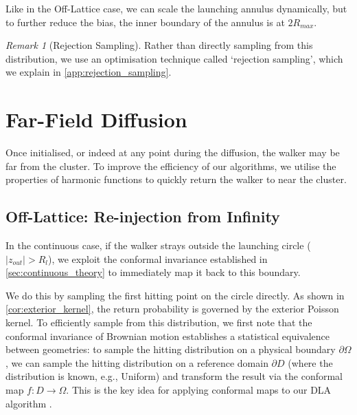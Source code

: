 \documentclass[12pt, a4paper, oneside]{report}
\theoremstyle{remark}
\newtheorem{remark}[theorem]{Remark}
\begin{document}
Like in the Off-Lattice case, we can scale the launching annulus dynamically, but to further reduce the bias, the inner boundary of the annulus is at $2R_{max}$.
\begin{remark}[Rejection Sampling]
Rather than directly sampling from this distribution, we use an optimisation technique called `rejection sampling', which we explain in \cref{app:rejection_sampling}.
\end{remark}


\section{Far-Field Diffusion}
\label{sec:far_field}
Once initialised, or indeed at any point during the diffusion, the walker may be far from the cluster. To improve the efficiency of our algorithms, we utilise the properties of harmonic functions to quickly return the walker to near the cluster.

\subsection{Off-Lattice: Re-injection from Infinity}
In the continuous case, if the walker strays outside the launching circle ($|z_{out}| > R_l$), we exploit the conformal invariance established in \cref{sec:continuous_theory} to immediately map it back to this boundary.

We do this by sampling the first hitting point on the circle directly. As shown in \cref{cor:exterior_kernel}, the return probability is governed by the exterior Poisson kernel.
To efficiently sample from this distribution, we first note that the conformal invariance of Brownian motion establishes a statistical equivalence between geometries: to sample the hitting distribution on a physical boundary $\partial \Omega$, we can sample the hitting distribution on a reference domain $\partial D$ (where the distribution is known, e.g., Uniform) and transform the result via the conformal map $f: D \to \Omega$. This is the key idea for applying conformal maps to our DLA algorithm \cite{Bell2019}. 
\end{document}

